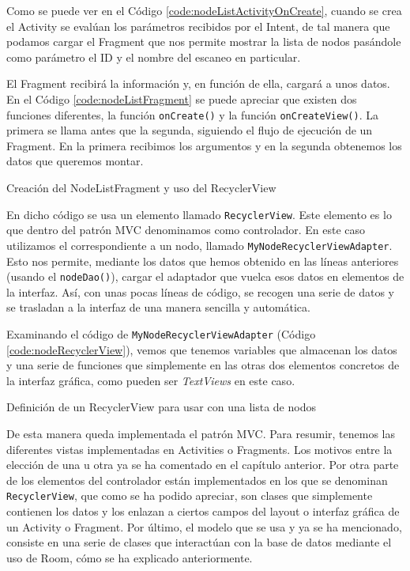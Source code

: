 Como se puede ver en el Código \ref{code:nodeListActivityOnCreate}, cuando se crea el Activity se evalúan los parámetros recibidos por el Intent, de tal manera que podamos cargar el Fragment que nos permite mostrar la lista de nodos pasándole como parámetro el ID y el nombre del escaneo en particular.

El Fragment recibirá la información y, en función de ella, cargará a unos datos. En el Código \ref{code:nodeListFragment} se puede apreciar que existen dos funciones diferentes, la función \texttt{onCreate()} y la función \texttt{onCreateView()}. La primera se llama antes que la segunda, siguiendo el flujo de ejecución de un Fragment. En la primera recibimos los argumentos y en la segunda obtenemos los datos que queremos montar.

\begin{code}
	\caption{Creación del NodeListFragment y uso del RecyclerView}
	\label{code:nodeListFragment}
	
\end{code}

En dicho código se usa un elemento llamado \texttt{RecyclerView}. Este elemento es lo que dentro del patrón MVC denominamos como controlador. En este caso utilizamos el correspondiente a un nodo, llamado \texttt{MyNodeRecyclerViewAdapter}. Esto nos permite, mediante los datos que hemos obtenido en las líneas anteriores (usando el \texttt{nodeDao()}), cargar el adaptador que vuelca esos datos en elementos de la interfaz. Así, con unas pocas líneas de código, se recogen una serie de datos y se trasladan a la interfaz de una manera sencilla y automática.

Examinando el código de \texttt{MyNodeRecyclerViewAdapter} (Código \ref{code:nodeRecyclerView}), vemos que tenemos variables que almacenan los datos y una serie de funciones que simplemente en las otras dos elementos concretos de la interfaz gráfica, como pueden ser \textit{TextViews} en este caso.

\begin{code}
	\caption{Definición de un RecyclerView para usar con una lista de nodos}
	\label{code:nodeRecyclerView}
	
\end{code}

De esta manera queda implementada el patrón MVC. Para resumir, tenemos las diferentes vistas implementadas en Activities o Fragments. Los motivos entre la elección de una u otra ya se ha comentado en el capítulo anterior. Por otra parte de los elementos del controlador están implementados en los que se denominan \texttt{RecyclerView}, que como se ha podido apreciar, son clases que simplemente contienen los datos y los enlazan a ciertos campos del layout o interfaz gráfica de un Activity o Fragment. Por último, el modelo que se usa y ya se ha mencionado, consiste en una serie de clases que interactúan con la base de datos mediante el uso de Room, cómo se ha explicado anteriormente.